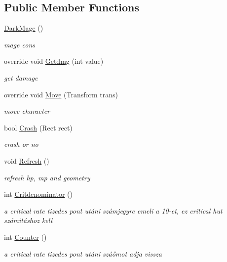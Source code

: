 \subsection*{Public Member Functions}
\begin{DoxyCompactItemize}
\item 
\hyperlink{class_lightdeath_1_1_dark_mage_ad28ad26a43cdbfc3c446f9add97e49d6}{Dark\+Mage} ()
\begin{DoxyCompactList}\small\item\em mage cons \end{DoxyCompactList}\item 
override void \hyperlink{class_lightdeath_1_1_dark_mage_a01e8b2ecfc7c649f384efe5b416507c1}{Getdmg} (int value)
\begin{DoxyCompactList}\small\item\em get damage \end{DoxyCompactList}\item 
override void \hyperlink{class_lightdeath_1_1_dark_mage_a5a8c5658cc98b552aa1ae4f7445054d8}{Move} (Transform trans)
\begin{DoxyCompactList}\small\item\em move character \end{DoxyCompactList}\item 
bool \hyperlink{class_lightdeath_1_1_dark_mage_afd47a01c9294fe8bb2aa483f8ce1c3d4}{Crash} (Rect rect)
\begin{DoxyCompactList}\small\item\em crash or no \end{DoxyCompactList}\item 
void \hyperlink{class_lightdeath_1_1_dark_mage_ae7d471554a94d2bda754a9098ed3423e}{Refresh} ()
\begin{DoxyCompactList}\small\item\em refresh hp, mp and geometry \end{DoxyCompactList}\item 
int \hyperlink{class_lightdeath_1_1_dark_mage_aca7462b02bbaed30f2c972e8f5ed36ff}{Critdenominator} ()
\begin{DoxyCompactList}\small\item\em a critical rate tizedes pont utáni számjegyre emeli a 10-\/et, ez critical hut számitáshoz kell \end{DoxyCompactList}\item 
int \hyperlink{class_lightdeath_1_1_dark_mage_a5cc5d664d5998b58636e4910ad574d75}{Counter} ()
\begin{DoxyCompactList}\small\item\em a critical rate tizedes pont utáni száőmot adja vissza \end{DoxyCompactList}\end{DoxyCompactItemize}
